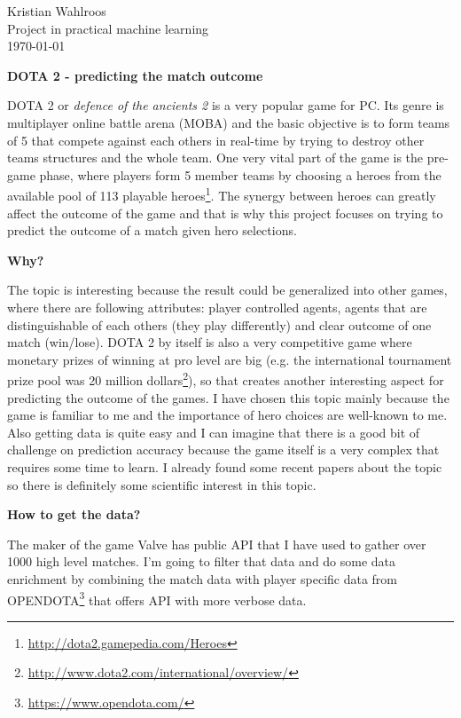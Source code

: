\documentclass[12pt]{article}
\begin{document}
\raggedright

	Kristian Wahlroos \\ Project in practical machine learning \\ \today

\centerline{\textbf{DOTA 2 - predicting the match outcome}}

DOTA 2 or \textit{defence of the ancients 2} is a very popular game for PC. Its genre is multiplayer online battle arena (MOBA) and the basic objective is to form teams of 5 that compete against each others in real-time by trying to destroy other teams structures and the whole team. 
One very vital part of the game is the pre-game phase, where players form 5 member teams by choosing a heroes from the available pool of 113 playable heroes\footnote{\url{http://dota2.gamepedia.com/Heroes}}. The synergy between heroes can greatly affect the outcome of the game and that is why this project focuses on trying to predict the outcome of a match given hero selections. 

\centerline{\textbf{Why?}}

The topic is interesting because the result could be generalized into other games, where there are following attributes: player controlled agents, agents that are distinguishable of each others (they play differently) and clear outcome of one match (win/lose). DOTA 2 by itself is also a very competitive game where monetary prizes of winning at pro level are big (e.g. the international tournament prize pool was 20 million dollars\footnote{\url{http://www.dota2.com/international/overview/}}), so that creates another interesting aspect for predicting the outcome of the games.
\newline
\newline
I have chosen this topic mainly because the game is familiar to me and the importance of hero choices are well-known to me. Also getting data is quite easy and I can imagine that there is a good bit of challenge on prediction accuracy because the game itself is a very complex that requires some time to learn. I already found some recent papers about the topic so there is definitely some scientific interest in this topic. 
 
\centerline{\textbf{How to get the data?}}

The maker of the game Valve has public API that I have used to gather over 1000 high level matches. I'm going to filter that data and do some data enrichment by combining the match data with player specific data from OPENDOTA\footnote{\url{https://www.opendota.com/}} that offers API with more verbose data.



\end{document}
